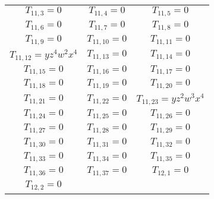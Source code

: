 \begin{longtable}{|c|c|c|}
$T_{11,3}= 0$&

$T_{11,4}= 0$&

$T_{11,5}= 0$\\

$T_{11,6}= 0$&

$T_{11,7}= 0$&

$T_{11,8}= 0$\\

$T_{11,9}= 0$&

$T_{11,10}= 0$&

$T_{11,11}= 0$\\

$T_{11,12}= yz^4w^2x^4$&

$T_{11,13}= 0$&

$T_{11,14}= 0$\\

$T_{11,15}= 0$&

$T_{11,16}= 0$&

$T_{11,17}= 0$\\

$T_{11,18}= 0$&

$T_{11,19}= 0$&

$T_{11,20}= 0$\\

$T_{11,21}= 0$&

$T_{11,22}= 0$&

$T_{11,23}= yz^2w^3x^4$\\

$T_{11,24}= 0$&

$T_{11,25}= 0$&

$T_{11,26}= 0$\\

$T_{11,27}= 0$&

$T_{11,28}= 0$&

$T_{11,29}= 0$\\

$T_{11,30}= 0$&

$T_{11,31}= 0$&

$T_{11,32}= 0$\\

$T_{11,33}= 0$&

$T_{11,34}= 0$&

$T_{11,35}= 0$\\

$T_{11,36}= 0$&

$T_{11,37}= 0$&

$T_{12,1}= 0$\\

$T_{12,2}= 0$&


\end{longtable}

